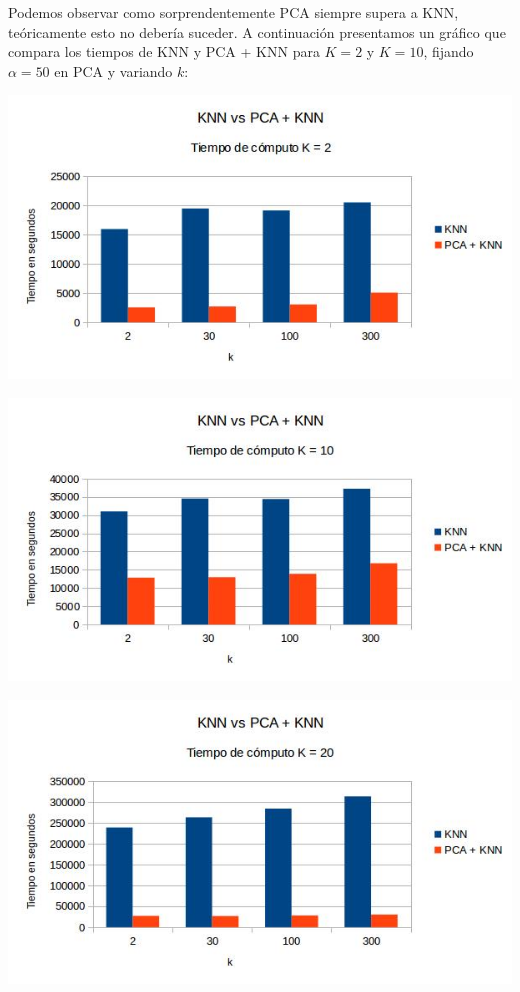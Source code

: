 Podemos observar como sorprendentemente PCA siempre supera a KNN, teóricamente esto no debería suceder.
\newline
\newline
A continuación presentamos un gráfico que compara los tiempos de KNN y PCA + KNN para $K = 2$ y $K = 10$, fijando $\alpha = 50$ en PCA y variando $k$:
\newline
\newline
\centerline{
\includegraphics[scale=0.5]{Tablas/comtcK2.jpg}
}
\centerline{
\includegraphics[scale=0.5]{Tablas/comtcK10.jpg}
}
\centerline{
\includegraphics[scale=0.5]{Tablas/comtcK20.jpg}
}

